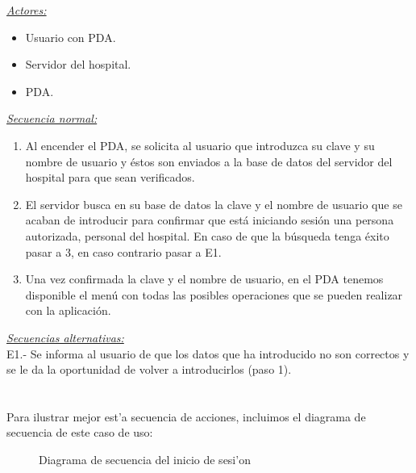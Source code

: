 \emph{\underline{Actores: }}
\begin{itemize}
	\item Usuario con PDA.
	\item Servidor del hospital.
	\item PDA.
\end{itemize}

\emph{\underline{Secuencia normal:}}
\begin{enumerate}
	\item Al encender el PDA, se solicita al usuario que introduzca su clave y su nombre de usuario y \'estos son enviados a la base de datos del servidor del hospital para que sean verificados.
	\item El servidor busca en su base de datos la clave y el nombre de usuario que se acaban de introducir para confirmar que est\'a iniciando sesi\'on una persona autorizada, personal del hospital. En caso de que la b\'usqueda tenga \'exito pasar a 3, en caso contrario pasar a E1.
	\item Una vez confirmada la clave y el nombre de usuario, en el PDA tenemos disponible el men\'u con todas las posibles operaciones que se pueden realizar con la aplicaci\'on.
\end{enumerate}

\emph{\underline{Secuencias alternativas:}}\\

E1.- Se informa al usuario de que los datos que ha introducido no son correctos y se le da la oportunidad de volver a introducirlos (paso 1).\\
\\\\

Para ilustrar mejor est'a secuencia de acciones, incluimos el diagrama de secuencia de este caso de uso:\\

\begin{figure}[h!]
	\begin{center}
     	\end{center}
    	\caption{Diagrama de secuencia del inicio de sesi'on}\label{fig:inicio_sesion}
\end{figure}